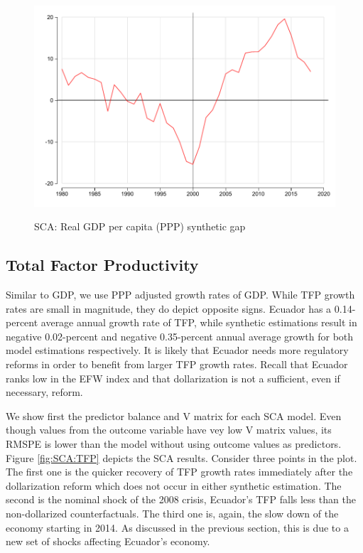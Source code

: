 \documentclass[12pt]{article}
\begin{document}
\begin{figure}[!htbp]
    \caption{SCA: Real GDP per capita (PPP) synthetic gap}
    \centering
    \includegraphics{STATA/Fig_GDP_GAP.pdf}
    \label{fig:SCA_gap}
\end{figure}

\subsection{Total Factor Productivity}

Similar to GDP, we use PPP adjusted growth rates of GDP. While TFP growth rates are small in magnitude, they do depict opposite signs. Ecuador has a 0.14-percent average annual growth rate of TFP, while synthetic estimations result in  negative 0.02-percent and negative 0.35-percent annual average growth for both model estimations respectively. It is likely that Ecuador needs more regulatory reforms in order to benefit from larger TFP growth rates. Recall that Ecuador ranks low in the EFW index and that dollarization is not a sufficient, even if necessary, reform.

We show first the predictor balance and V matrix for each SCA model. Even though values from the outcome variable have vey low V matrix values, its RMSPE is lower than the model without using outcome values as predictors. Figure \ref{fig:SCA:TFP} depicts the SCA results. Consider three points in the plot. The first one is the quicker recovery of TFP growth rates immediately after the dollarization reform which does not occur in either synthetic estimation. The second is the nominal shock of the 2008 crisis, Ecuador's TFP falls less than the non-dollarized counterfactuals. The third one is, again, the slow down of the economy starting in 2014. As discussed in the previous section, this is due to a new set of shocks affecting Ecuador's economy.
\end{document}
